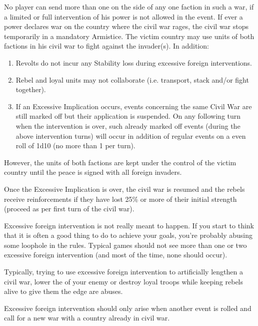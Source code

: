 No player can send more than one \ARMY\faceplus on the side of any one faction
in such a war, if a limited or full intervention of his power is not allowed
in the event.
\bparag If ever a power declares war on the country where the civil war rages,
the civil war stops temporarily in a mandatory Armistice. The victim country
may use units of both factions in his civil war to fight against the
invader(s). In addition:
\begin{enumerate}
\item Revolts do not incur any Stability loss during excessive foreign
  interventions.
\item Rebel and loyal units may not collaborate (i.e. transport, stack and/or
  fight together).
\item If an Excessive Implication occurs, events concerning the same Civil War
  are still marked off but their application is suspended. On any following
  turn when the intervention is over, such already marked off events (during
  the above intervention turns) will occur in addition of regular events on a
  even roll of 1d10 (no more than 1 per turn).
\end{enumerate}
\bparag However, the units of both factions are kept under the control of the
victim country until the peace is signed with all foreign invaders.

\bparag Once the Excessive Implication is over, the civil war is resumed and
the rebels receive reinforcements if they have lost 25\% or more of their
initial strength (proceed as per first turn of the civil war).

\begin{designnote}
  Excessive foreign intervention is not really meant to happen. If you start
  to think that it is often a good thing to do to achieve your goals, you're
  probably abusing some loophole in the rules. Typical games should not see
  more than one or two excessive foreign intervention (and most of the time,
  none should occur).

  Typically, trying to use excessive foreign intervention to artificially
  lengthen a civil war, lower the \STAB of your enemy or destroy loyal troops
  while keeping rebels alive to give them the edge are abuses.

  Excessive foreign intervention should only arise when another event is
  rolled and call for a new war with a country already in civil war.
\end{designnote}

